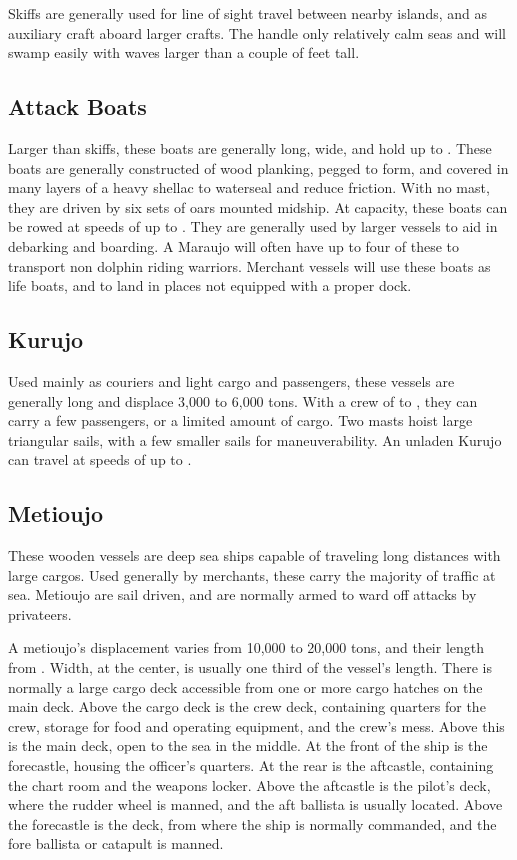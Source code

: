 \begin{multicols*}{2}
Skiffs are generally used for line of sight travel between nearby islands, and as auxiliary craft aboard larger crafts. The handle only relatively calm seas and will swamp
easily with waves larger than a couple of feet tall.
\subsection{Attack Boats}
Larger than skiffs, these boats are generally  long,  wide, and hold up to . These boats are generally constructed of wood planking, pegged to form, and covered in many layers of a heavy shellac to waterseal and reduce friction. With no mast, they are driven by six sets of oars mounted midship. At capacity, these boats can be rowed at speeds of up to . They are generally used by larger vessels to aid in debarking and boarding. A Maraujo will often have up to four of these to transport non dolphin riding warriors. Merchant vessels will use these boats as life boats, and to land in places not equipped with a proper dock.
\subsection{Kurujo}
Used mainly as couriers and light cargo and passengers, these vessels are generally  long and displace 3,000 to 6,000 tons. With a crew of  to , they can carry a few passengers, or a limited amount of cargo. Two masts hoist large triangular sails, with a few smaller sails for maneuverability. An unladen Kurujo can travel at speeds of up to .
\subsection{Metioujo}
These wooden vessels are deep sea ships capable of traveling long distances with large cargos. Used generally by merchants, these carry the majority of traffic at sea. Metioujo are sail driven, and are normally armed to ward off attacks by privateers.

A metioujo’s displacement varies from 10,000 to 20,000 tons, and their length from . Width, at the center, is usually one third of the vessel’s length. There is normally a large cargo deck accessible from one or more cargo hatches on the main deck. Above the cargo deck is the crew deck, containing quarters for the crew, storage for food and operating equipment, and the crew’s mess. Above this is the main deck, open to the sea in the middle. At the front of the ship is the forecastle, housing the officer’s quarters. At the
rear is the aftcastle, containing the chart room and the weapons locker. Above the aftcastle is the pilot’s deck, where the rudder wheel is manned, and the aft ballista is usually
located. Above the forecastle is the  deck, from where the ship is normally commanded, and the fore ballista or catapult is manned.


\end{multicols*}

